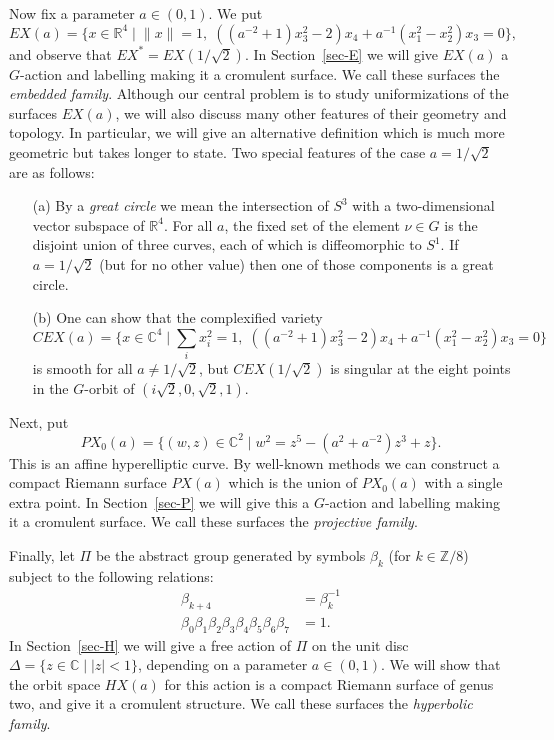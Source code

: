 \documentclass[reqno]{amsart}
\newcommand{\Dl}        {\Delta}
\newcommand{\bt}        {\beta}
\newcommand{\Z}         {{\mathbb{Z}}}
\newcommand{\R}         {{\mathbb{R}}}
\newcommand{\C}         {{\mathbb{C}}}
\newcommand{\st}        {\;|\;}
\newcommand{\rt}        {\sqrt{2}}
\renewcommand{\:}{\colon}
\theoremstyle{definition}
\begin{document}
Now fix a parameter $a\in (0,1)$.  We put
\[ EX(a) = \{x\in\R^4\st \|x\|=1,\;
              ((a^{-2}+1)x_3^2-2)x_4+a^{-1}(x_1^2-x_2^2)x_3=0\},
\]
and observe that $EX^*=EX(1/\rt)$.  In Section~\ref{sec-E} we
will give $EX(a)$ a $G$-action and labelling making it a cromulent
surface.  We call these surfaces the \emph{embedded family}.  Although
our central problem is to study uniformizations of the surfaces
$EX(a)$, we will also discuss many other features of their geometry
and topology.  In particular, we will give an alternative definition
which is much more geometric but takes longer to state.  Two special
features of the case $a=1/\rt$ are as follows:
\begin{itemize}
 \item[(a)] By a \emph{great circle} we mean the intersection of $S^3$
  with a two-dimensional vector subspace of $\R^4$.  For all $a$, the
  fixed set of the element $\nu\in G$ is the disjoint union of three
  curves, each of which is diffeomorphic to $S^1$.  If
  $a=1/\rt$ (but for no other value) then one of those components
  is a great circle.
 \item[(b)] One can show that the complexified variety
  \[ CEX(a) = \{x\in\C^4\st \sum_ix_i^2=1,\;
               ((a^{-2}+1)x_3^2-2)x_4+a^{-1}(x_1^2-x_2^2)x_3=0\}
  \]
  is smooth for all $a\neq 1/\rt$, but $CEX(1/\rt)$ is
  singular at the eight points in the $G$-orbit of
  $(i\rt,0,\rt,1)$.
\end{itemize}

Next, put
\[ PX_0(a) = \{(w,z)\in\C^2\st w^2=z^5-(a^2+a^{-2})z^3+z\}. \]
This is an affine hyperelliptic curve.  By well-known methods we can
construct a compact Riemann surface $PX(a)$ which is the union of
$PX_0(a)$ with a single extra point.  In
Section~\ref{sec-P} we will give this a $G$-action and
labelling making it a cromulent surface.  We call these surfaces the
\emph{projective family}.

Finally, let $\Pi$ be the abstract group generated by symbols $\bt_k$
(for $k\in\Z/8$) subject to the following relations:
\begin{align*}
 \bt_{k+4} &= \bt_k^{-1} \\
 \bt_0\bt_1\bt_2\bt_3\bt_4\bt_5\bt_6\bt_7 &= 1.
\end{align*}
In Section~\ref{sec-H} we will give a free action of $\Pi$ on
the unit disc $\Dl=\{z\in\C\st |z|<1\}$, depending on a parameter
$a\in(0,1)$.  We will show that the orbit space $HX(a)$ for this
action is a compact Riemann surface of genus two, and give it a
cromulent structure.  We call these surfaces the \emph{hyperbolic family}.
\end{document}
